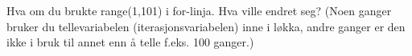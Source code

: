 %
%
Hva om du brukte range(1,101) i for-linja. Hva ville endret seg? (Noen ganger bruker du tellevariabelen (iterasjonsvariabelen) inne i løkka, andre ganger er den ikke i bruk til annet enn å telle f.eks. 100 ganger.)
